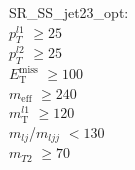 SR\_SS\_jet23\_opt: \\
$p_T^{l1}$ $\geq 25$ \\
$p_T^{l2}$ $\geq 25$ \\
$E_{\text{T}}^{\text{miss}}$ $\geq 100$ \\
$m_{\text{eff}}$ $\geq 240$ \\
$m_{\text{T}}^{l1}$ $\geq 120$ \\
$m_{lj}$/$m_{ljj}$ $<130$ \\
$m_{T2}$ $\geq 70$ \\
